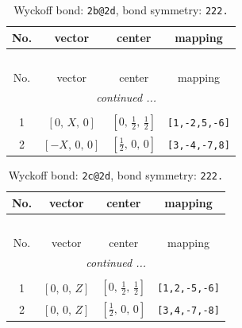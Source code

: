 \documentclass[fleqn,8pt]{jsarticle}
\begin{document}
\renewcommand{\arraystretch}{1.2}
\begin{longtable}{cccc}
\caption{Wyckoff bond: {\tt 2b@2d}, bond symmetry: {\tt 222.}}
 \\
 \hline \hline
No. & vector & center & mapping \\ \hline \endfirsthead

\multicolumn{3}{l}{\tablename\ \thetable{}} \\
 \hline \hline
No. & vector & center & mapping \\ \hline \endhead

 \hline \hline
\multicolumn{3}{r}{\footnotesize\it continued ...} \\ \endfoot

 \hline \hline
\multicolumn{3}{r}{} \\ \endlastfoot

1 & $\left[ 0,\, X,\, 0 \right]$ & $\left[ 0,\, \frac{1}{2},\, \frac{1}{2} \right]$ & {\tt [1,-2,5,-6]} \\ \hline
2 & $\left[ - X,\, 0,\, 0 \right]$ & $\left[ \frac{1}{2},\, 0,\, 0 \right]$ & {\tt [3,-4,-7,8]} \\
\end{longtable}
\renewcommand{\arraystretch}{1.2}
\begin{longtable}{cccc}
\caption{Wyckoff bond: {\tt 2c@2d}, bond symmetry: {\tt 222.}}
 \\
 \hline \hline
No. & vector & center & mapping \\ \hline \endfirsthead

\multicolumn{3}{l}{\tablename\ \thetable{}} \\
 \hline \hline
No. & vector & center & mapping \\ \hline \endhead

 \hline \hline
\multicolumn{3}{r}{\footnotesize\it continued ...} \\ \endfoot

 \hline \hline
\multicolumn{3}{r}{} \\ \endlastfoot

1 & $\left[ 0,\, 0,\, Z \right]$ & $\left[ 0,\, \frac{1}{2},\, \frac{1}{2} \right]$ & {\tt [1,2,-5,-6]} \\ \hline
2 & $\left[ 0,\, 0,\, Z \right]$ & $\left[ \frac{1}{2},\, 0,\, 0 \right]$ & {\tt [3,4,-7,-8]} \\
\end{longtable}
\renewcommand{\arraystretch}{1.2}
\end{document}
